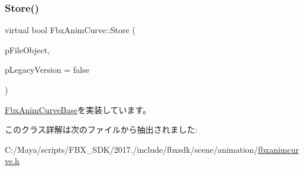 \subsubsection{\texorpdfstring{Store()}{Store()}}
{\footnotesize\ttfamily virtual bool Fbx\+Anim\+Curve\+::\+Store (\begin{DoxyParamCaption}\item[{\hyperlink{class_fbx_i_o}{Fbx\+IO} $\ast$}]{p\+File\+Object,  }\item[{bool}]{p\+Legacy\+Version = {\ttfamily false} }\end{DoxyParamCaption})\hspace{0.3cm}{\ttfamily [pure virtual]}}



\hyperlink{class_fbx_anim_curve_base_a82eba55521f1c0e792b71cb432dac170}{Fbx\+Anim\+Curve\+Base}を実装しています。



このクラス詳解は次のファイルから抽出されました\+:\begin{DoxyCompactItemize}
\item 
C\+:/\+Maya/scripts/\+F\+B\+X\+\_\+\+S\+D\+K/2017./include/fbxsdk/scene/animation/\hyperlink{fbxanimcurve_8h}{fbxanimcurve.\+h}\end{DoxyCompactItemize}
